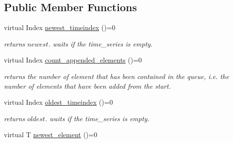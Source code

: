 \subsection*{Public Member Functions}
\begin{DoxyCompactItemize}
\item 
virtual Index \hyperlink{classtime__series_1_1TimeSeriesInterface_a3f15f770cc9620d11ec1e7a123977cf3}{newest\+\_\+timeindex} ()=0\hypertarget{classtime__series_1_1TimeSeriesInterface_a3f15f770cc9620d11ec1e7a123977cf3}{}\label{classtime__series_1_1TimeSeriesInterface_a3f15f770cc9620d11ec1e7a123977cf3}

\begin{DoxyCompactList}\small\item\em returns $ newest $. waits if the time\+\_\+series is empty. \end{DoxyCompactList}\item 
virtual Index \hyperlink{classtime__series_1_1TimeSeriesInterface_a46cf7fc73adfcc400fbf40c22aa7268f}{count\+\_\+appended\+\_\+elements} ()=0\hypertarget{classtime__series_1_1TimeSeriesInterface_a46cf7fc73adfcc400fbf40c22aa7268f}{}\label{classtime__series_1_1TimeSeriesInterface_a46cf7fc73adfcc400fbf40c22aa7268f}

\begin{DoxyCompactList}\small\item\em returns the number of element that has been contained in the queue, i.\+e. the number of elements that have been added from the start. \end{DoxyCompactList}\item 
virtual Index \hyperlink{classtime__series_1_1TimeSeriesInterface_a96635723dc065cebb65d63de4f54b4a9}{oldest\+\_\+timeindex} ()=0\hypertarget{classtime__series_1_1TimeSeriesInterface_a96635723dc065cebb65d63de4f54b4a9}{}\label{classtime__series_1_1TimeSeriesInterface_a96635723dc065cebb65d63de4f54b4a9}

\begin{DoxyCompactList}\small\item\em returns $ oldest $. waits if the time\+\_\+series is empty. \end{DoxyCompactList}\item 
virtual T \hyperlink{classtime__series_1_1TimeSeriesInterface_ad3b66b6b5f0f763d440731c50e41b4cb}{newest\+\_\+element} ()=0\hypertarget{classtime__series_1_1TimeSeriesInterface_ad3b66b6b5f0f763d440731c50e41b4cb}{}\label{classtime__series_1_1TimeSeriesInterface_ad3b66b6b5f0f763d440731c50e41b4cb}


\end{DoxyCompactItemize}
